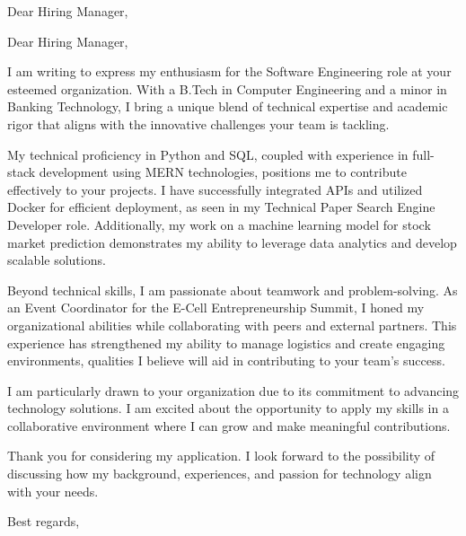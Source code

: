 \documentclass{letter}
\date{\today}
\begin{document}
\begin{letter}{Dear Hiring Manager,}

\opening{Dear Hiring Manager,}

I am writing to express my enthusiasm for the Software Engineering role at your esteemed organization. With a B.Tech in Computer Engineering and a minor in Banking Technology, I bring a unique blend of technical expertise and academic rigor that aligns with the innovative challenges your team is tackling.

My technical proficiency in Python and SQL, coupled with experience in full-stack development using MERN technologies, positions me to contribute effectively to your projects. I have successfully integrated APIs and utilized Docker for efficient deployment, as seen in my Technical Paper Search Engine Developer role. Additionally, my work on a machine learning model for stock market prediction demonstrates my ability to leverage data analytics and develop scalable solutions.

Beyond technical skills, I am passionate about teamwork and problem-solving. As an Event Coordinator for the E-Cell Entrepreneurship Summit, I honed my organizational abilities while collaborating with peers and external partners. This experience has strengthened my ability to manage logistics and create engaging environments, qualities I believe will aid in contributing to your team's success.

I am particularly drawn to your organization due to its commitment to advancing technology solutions. I am excited about the opportunity to apply my skills in a collaborative environment where I can grow and make meaningful contributions.

Thank you for considering my application. I look forward to the possibility of discussing how my background, experiences, and passion for technology align with your needs.

\closing{Best regards,}

\end{letter}
\end{document}

